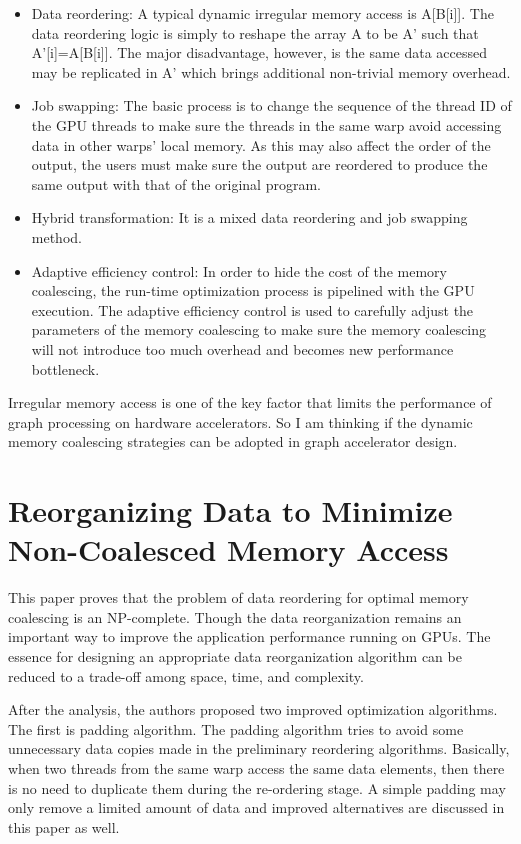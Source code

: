 \begin{itemize}
    \item Data reordering: A typical dynamic irregular memory access is A[B[i]].
        The data reordering logic is simply to reshape the array A to be A' such
        that A'[i]=A[B[i]]. The major disadvantage, however, is the same data
        accessed may be replicated in A' which brings additional non-trivial memory
        overhead.
    \item Job swapping: The basic process is to change the sequence of the
        thread ID of the GPU threads to make sure the threads in the same warp
        avoid accessing data in other warps' local memory. As this may also
        affect the order of the output, the users must make sure the output are
        reordered to produce the same output with that of the original program.
    \item Hybrid transformation: It is a mixed data reordering and job swapping
        method.
    \item Adaptive efficiency control: In order to hide the cost of the memory
        coalescing, the run-time optimization process is pipelined with the GPU
        execution. The adaptive efficiency control is used to carefully adjust
        the parameters of the memory coalescing to make sure the memory
        coalescing will not introduce too much overhead and becomes new
        performance bottleneck.
\end{itemize}

Irregular memory access is one of the key factor that limits the performance of
graph processing on hardware accelerators. So I am thinking if the dynamic
memory coalescing strategies can be adopted in graph accelerator design. 

\section{Reorganizing Data to Minimize Non-Coalesced Memory Access}
This paper \cite{wu2013complexity} proves that the problem of data reordering for optimal memory
coalescing is an NP-complete. Though the data reorganization remains an
important way to improve the application performance running on GPUs. The
essence for designing an appropriate data reorganization algorithm can be
reduced to a trade-off among space, time, and complexity.

After the analysis, the authors proposed two improved optimization algorithms.
The first is padding algorithm. The padding algorithm tries to avoid some
unnecessary data copies made in the preliminary reordering algorithms.
Basically, when two threads from the same warp access the same data elements,
then there is no need to duplicate them during the re-ordering stage. A simple
padding may only remove a limited amount of data and improved alternatives are
discussed in this paper as well.


